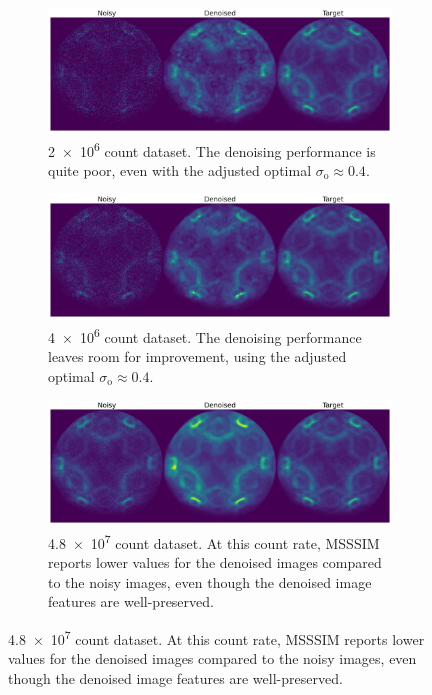 \begin{figure}
    \centering

    \begin{subfigure}[b]{1\linewidth}
        \centering
        \includegraphics[width=1\linewidth]{images/noisy_denoised_ref_2M_avg_bm3d.pdf}
        \caption{\num{2e6} count dataset. The denoising performance is quite poor, even with the adjusted optimal $\sigma_{\text{o}}\approx0.4$.}
        \label{fig:noisy-denoised-ref-2M-avg-bm3d}
    \end{subfigure}

    \begin{subfigure}[b]{1\linewidth}
        \centering
        \includegraphics[width=1\linewidth]{images/noisy_denoised_ref_4M_avg_bm3d.pdf}
        \caption{\num{4e6} count dataset. The denoising performance leaves room for improvement, using the adjusted optimal $\sigma_{\text{o}}\approx0.4$.}
        \label{fig:noisy-denoised-ref-4M-avg-bm3d}
    \end{subfigure}

    \begin{subfigure}[b]{1\linewidth}
        \centering
        \includegraphics[width=1\linewidth]{images/noisy_denoised_ref_48M_avg_bm3d.pdf}
        \caption{\num{4.8e7} count dataset. At this count rate, \gls{MSSSIM} reports lower values for the denoised images compared to the noisy images, even though the denoised image features are well-preserved.}
        \label{fig:noisy-denoised-ref-48M-avg-bm3d}
    \end{subfigure}


\end{figure}
